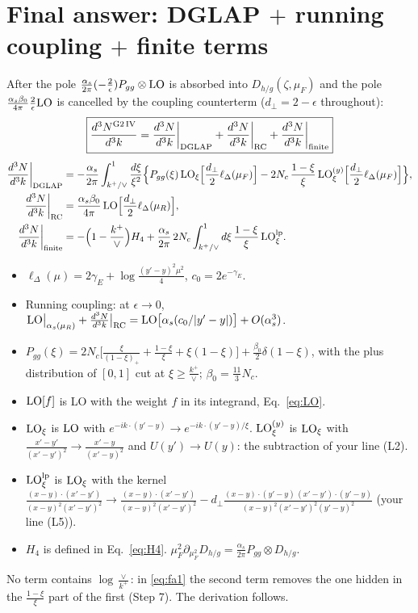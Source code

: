 \documentclass[10pt]{article}
\numberwithin{equation}{section}
\newcommand{\LO}{{\rm LO}}
\begin{document}
\section{Final answer: DGLAP $+$ running coupling $+$ finite terms}
After the pole $\frac{\alpha_s}{2\pi}(-\frac{2}{\epsilon})P_{gg}\otimes\LO$ is absorbed into $D_{h/g}(\zeta,\mu_F)$ and the pole $\frac{\alpha_s\beta_0}{4\pi}\frac{2}{\epsilon}\LO$ is cancelled by the coupling counterterm ($d_\perp=2-\epsilon$ throughout):
\begin{equation}
\boxed{\frac{d^3N^{\rm G2\,IV}}{d^3k}=\frac{d^3N}{d^3k}\bigg|_{\rm DGLAP}+\frac{d^3N}{d^3k}\bigg|_{\rm RC}+\frac{d^3N}{d^3k}\bigg|_{\rm finite}}
\end{equation}
\begin{align}
\frac{d^3N}{d^3k}\bigg|_{\rm DGLAP}&=-\frac{\alpha_s}{2\pi}\int_{k^+/\vee}^1\frac{d\xi}{\xi^2}\Big\{P_{gg}(\xi)\,\LO_\xi\Big[\frac{d_\perp}{2}\ell_\Delta(\mu_F)\Big]-2N_c\,\frac{1-\xi}{\xi}\,\LO^{(y)}_\xi\Big[\frac{d_\perp}{2}\ell_\Delta(\mu_F)\Big]\Big\},\label{eq:fa1}\\
\frac{d^3N}{d^3k}\bigg|_{\rm RC}&=\frac{\alpha_s\beta_0}{4\pi}\,\LO\Big[\frac{d_\perp}{2}\ell_\Delta(\mu_R)\Big],\label{eq:fa2}\\
\frac{d^3N}{d^3k}\bigg|_{\rm finite}&=-\Big(1-\frac{k^+}{\vee}\Big)H_4+\frac{\alpha_s}{2\pi}\,2N_c\int_{k^+/\vee}^1d\xi\,\frac{1-\xi}{\xi}\,\LO^{\rm lp}_\xi.\label{eq:fa3}
\end{align}
\begin{itemize}
\item $\ell_\Delta(\mu)=2\gamma_E+\log\frac{(y'-y)^2\mu^2}{4}$, $c_0=2e^{-\gamma_E}$.
\item Running coupling: at $\epsilon\to0$, $\LO\big|_{\alpha_s(\mu_R)}+\frac{d^3N}{d^3k}\big|_{\rm RC}=\LO\big[\alpha_s(c_0/|y'-y|)\big]+O(\alpha_s^3)$.
\item $P_{gg}(\xi)=2N_c\big[\frac{\xi}{(1-\xi)_+}+\frac{1-\xi}{\xi}+\xi(1-\xi)\big]+\frac{\beta_0}{2}\delta(1-\xi)$, with the plus distribution of $[0,1]$ cut at $\xi\ge\frac{k^+}{\vee}$; $\beta_0=\frac{11}{3}N_c$.
\item $\LO[f]$ is LO with the weight $f$ in its integrand, Eq.~\eqref{eq:LO}.
\item $\LO_\xi$ is $\LO$ with $e^{-ik\cdot(y'-y)}\to e^{-ik\cdot(y'-y)/\xi}$. $\LO^{(y)}_\xi$ is $\LO_\xi$ with $\frac{x'-y'}{(x'-y')^2}\to\frac{x'-y}{(x'-y)^2}$ and $U(y')\to U(y)$: the subtraction of your line (L2).
\item $\LO^{\rm lp}_\xi$ is $\LO_\xi$ with the kernel $\frac{(x-y)\cdot(x'-y')}{(x-y)^2(x'-y')^2}\to\frac{(x-y)\cdot(x'-y')}{(x-y)^2(x'-y')^2}-d_\perp\frac{(x-y)\cdot(y'-y)\,(x'-y')\cdot(y'-y)}{(x-y)^2(x'-y')^2(y'-y)^2}$ (your line (L5)).
\item $H_4$ is defined in Eq.~\eqref{eq:H4}. $\mu_F^2\partial_{\mu_F^2}D_{h/g}=\frac{\alpha_s}{2\pi}P_{gg}\otimes D_{h/g}$.
\end{itemize}
No term contains $\log\frac{\vee}{k^+}$: in \eqref{eq:fa1} the second term removes the one hidden in the $\frac{1-\xi}{\xi}$ part of the first (Step 7). The derivation follows.
\end{document}
